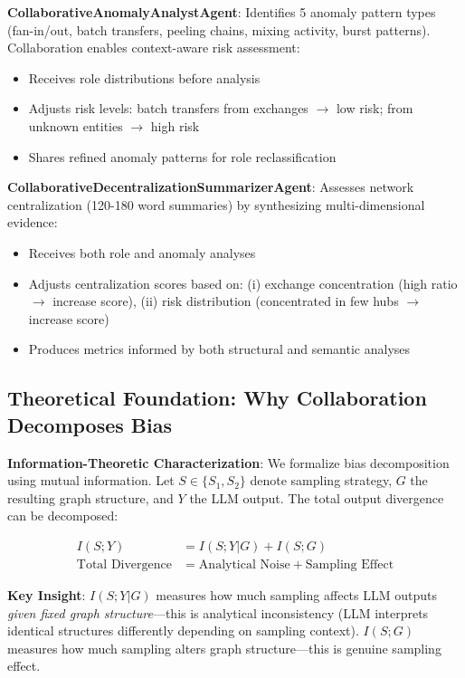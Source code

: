 \documentclass[conference]{IEEEtran}
\begin{document}
\textbf{CollaborativeAnomalyAnalystAgent}: Identifies 5 anomaly pattern types (fan-in/out, batch transfers, peeling chains, mixing activity, burst patterns). Collaboration enables context-aware risk assessment:
\begin{itemize}
    \item Receives role distributions before analysis
    \item Adjusts risk levels: batch transfers from exchanges $\rightarrow$ low risk; from unknown entities $\rightarrow$ high risk
    \item Shares refined anomaly patterns for role reclassification
\end{itemize}

\textbf{CollaborativeDecentralizationSummarizerAgent}: Assesses network centralization (120-180 word summaries) by synthesizing multi-dimensional evidence:
    \begin{itemize}
    \item Receives both role and anomaly analyses
    \item Adjusts centralization scores based on: (i) exchange concentration (high ratio $\rightarrow$ increase score), (ii) risk distribution (concentrated in few hubs $\rightarrow$ increase score)
    \item Produces metrics informed by both structural and semantic analyses
    \end{itemize}

\subsection{Theoretical Foundation: Why Collaboration Decomposes Bias}

\textbf{Information-Theoretic Characterization}: We formalize bias decomposition using mutual information. Let $S \in \{S_1, S_2\}$ denote sampling strategy, $G$ the resulting graph structure, and $Y$ the LLM output. The total output divergence can be decomposed:

\begin{align}
I(S; Y) &= I(S; Y | G) + I(S; G) \\
\text{Total Divergence} &= \text{Analytical Noise} + \text{Sampling Effect}
\end{align}

\textbf{Key Insight}: $I(S; Y | G)$ measures how much sampling affects LLM outputs \textit{given fixed graph structure}—this is analytical inconsistency (LLM interprets identical structures differently depending on sampling context). $I(S; G)$ measures how much sampling alters graph structure—this is genuine sampling effect.
\end{document}
